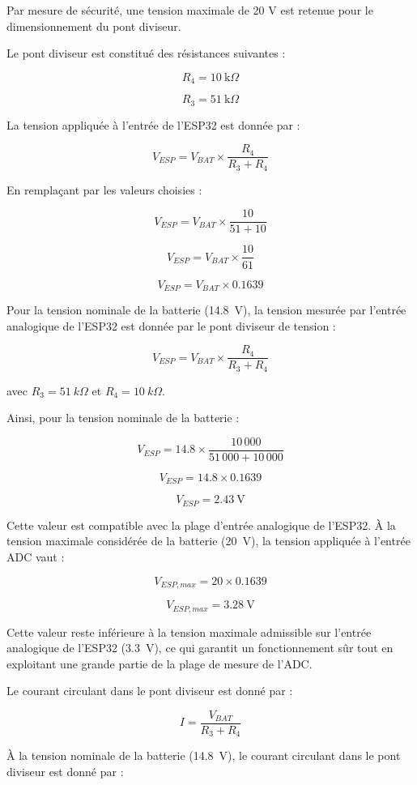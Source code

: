 Par mesure de sécurité, une tension maximale de 20 V est retenue pour le dimensionnement du pont diviseur.

Le pont diviseur est constitué des résistances suivantes :

$$
R_4 = 10~\mathrm{k}\Omega
$$

$$
R_3 = 51~\mathrm{k}\Omega
$$

La tension appliquée à l'entrée de l'ESP32 est donnée par :

\begin{equation}
    V_{ESP}=V_{BAT}\times\frac{R_4}{R_3+R_4}  
\end{equation}

En remplaçant par les valeurs choisies :

$$
V_{ESP}=V_{BAT}\times\frac{10}{51+10}
$$

$$
V_{ESP}=V_{BAT}\times\frac{10}{61}
$$

$$
V_{ESP}=V_{BAT}\times0.1639
$$

Pour la tension nominale de la batterie (\SI{14.8}{V}), la tension mesurée par l'entrée analogique de l'ESP32 est donnée par le pont diviseur de tension :

\[
V_{ESP}=V_{BAT}\times\frac{R_4}{R_3+R_4}
\]

avec \(R_3=\SI{51}{k\Omega}\) et \(R_4=\SI{10}{k\Omega}\).

Ainsi, pour la tension nominale de la batterie :

\[
V_{ESP}=14.8\times\frac{10\,000}{51\,000+10\,000}
\]

\[
V_{ESP}=14.8\times0.1639
\]

\[
V_{ESP}=2.43~\mathrm{V}
\]

Cette valeur est compatible avec la plage d'entrée analogique de l'ESP32. À la tension maximale considérée de la batterie (\SI{20}{V}), la tension appliquée à l'entrée ADC vaut :

\[
V_{ESP,max}=20\times0.1639
\]

\[
V_{ESP,max}=3.28~\mathrm{V}
\]

Cette valeur reste inférieure à la tension maximale admissible sur l'entrée analogique de l'ESP32 (\SI{3.3}{V}), ce qui garantit un fonctionnement sûr tout en exploitant une grande partie de la plage de mesure de l'ADC.

Le courant circulant dans le pont diviseur est donné par :

\[
I=\frac{V_{BAT}}{R_3+R_4}
\]

À la tension nominale de la batterie (\SI{14.8}{V}), le courant circulant dans le pont diviseur est donné par :

